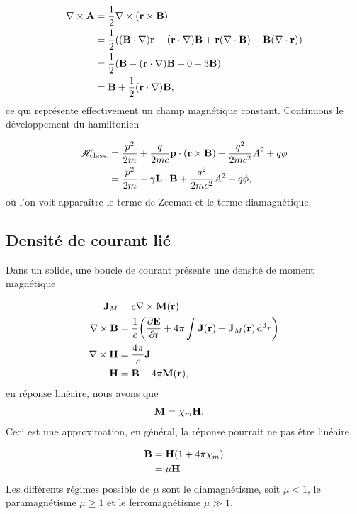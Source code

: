 \begin{align}
    \nabla\times\vb{A}&=\frac12\nabla\times(\vb{r}\times\vb{B})\\
                      &=\frac12\qty((\vb{B}\cdot\nabla)\vb{r}-(\vb{r}\cdot\nabla)\vb{B}
                      +\vb{r}(\nabla\cdot\vb{B})-\vb{B}(\nabla\cdot\vb{r}))\\
                      &=\frac12\qty(\vb{B}-(\vb{r}\cdot\nabla)\vb{B}+0-3\vb{B})\\
                    &=\vb{B}+\frac12(\vb{r}\cdot\nabla)\vb{B},
\end{align}
ce qui représente effectivement un champ magnétique constant. Continuons le
développement du hamiltonien

\begin{align}
    \mathscr{H}_{\rm class.}&=\frac{p^2}{2m}+\frac q{2mc}\vb{p}\cdot(\vb{r}\times\vb{B})
    +\frac{q^2}{2mc^2}A^2+q\phi\\
                            &=\frac{p^2}{2m}-\gamma\vb{L}\cdot\vb{B}+\frac{q^2}{2mc^2}
                            A^2+q\phi,
\end{align}
où l'on voit apparaître le terme de Zeeman et le terme diamagnétique.


\subsection{Densité de courant lié} %
\label{sub:Densité de courant lié}

Dans un solide, une boucle de courant présente une densité de moment magnétique

\begin{align}
    \vb{J}_{M}&=c\nabla\times\vb{M}(\vb{r})\\
    \nabla\times\vb{B}&=\frac1c\qty(\pdv{\vb{E}}{t}+4\pi\int\vb{J}(\vb{r})+\vb{J}_M(\vb{r})\dd[3]{r})\\
    \nabla\times\vb{H}&=\frac{4\pi}{c}\vb{J}\\
    \vb{H}&=\vb{B}-4\pi\vb{M}(\vb{r}),
\end{align}
en réponse linéaire, nous avons que
\begin{align}
    \vb{M}&=\chi_m\vb{H}.
\end{align}
Ceci est une approximation, en général, la réponse pourrait ne pas être linéaire.

\begin{align}
    \vb{B}&=\vb{H}\qty(1+4\pi\chi_m)\\
          &=\mu\vb{H}
\end{align}
Les différents régimes possible de $\mu$ sont le diamagnétisme, soit $\mu<1$,
le paramagnétisme $\mu\ge1$ et le ferromagnétisme $\mu\gg1$.

